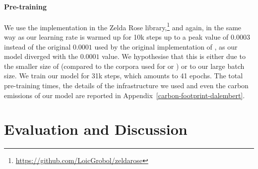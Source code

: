 \paragraph{Pre-training}
We use the \roberta implementation in the Zelda Rose library,\footnote{\url{https://github.com/LoicGrobol/zeldarose}} and again, in the same way as  our learning rate is warmed up for 10k steps up to a peak value of $0.0003$ instead of the original $0.0001$ used by the original implementation of \roberta \cite{liu-etal-2019-roberta}, as our model diverged with the $0.0001$ value. We hypothesise that this is either due to the smaller size of \freemmax (compared to the corpora used for \roberta or \camembert) or to our large batch size. We train our model for 31k steps, which amounts to 41 epochs. The total pre-training times, the details of the infrastructure we used and even the carbon emissions of our model are reported in Appendix~\ref{carbon-footprint-dalembert}.

\section{Evaluation and Discussion}

